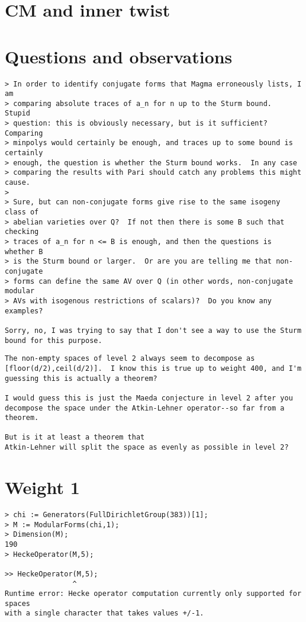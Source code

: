 \documentclass[11pt]{amsart}
\numberwithin{equation}{subsection}
\theoremstyle{definition}
\begin{document}
\section{CM and inner twist}

\section{Questions and observations}

\begin{verbatim}
> In order to identify conjugate forms that Magma erroneously lists, I am
> comparing absolute traces of a_n for n up to the Sturm bound.  Stupid
> question: this is obviously necessary, but is it sufficient?  Comparing
> minpolys would certainly be enough, and traces up to some bound is certainly
> enough, the question is whether the Sturm bound works.  In any case
> comparing the results with Pari should catch any problems this might cause.
>
> Sure, but can non-conjugate forms give rise to the same isogeny class of
> abelian varieties over Q?  If not then there is some B such that checking
> traces of a_n for n <= B is enough, and then the questions is whether B
> is the Sturm bound or larger.  Or are you are telling me that non-conjugate
> forms can define the same AV over Q (in other words, non-conjugate modular
> AVs with isogenous restrictions of scalars)?  Do you know any examples?

Sorry, no, I was trying to say that I don't see a way to use the Sturm
bound for this purpose.
\end{verbatim}

\begin{verbatim}
The non-empty spaces of level 2 always seem to decompose as [floor(d/2),ceil(d/2)].  I know this is true up to weight 400, and I'm guessing this is actually a theorem?

I would guess this is just the Maeda conjecture in level 2 after you
decompose the space under the Atkin-Lehner operator--so far from a
theorem.

But is it at least a theorem that
Atkin-Lehner will split the space as evenly as possible in level 2?
\end{verbatim}

\section{Weight 1}

\begin{verbatim}
> chi := Generators(FullDirichletGroup(383))[1];
> M := ModularForms(chi,1);
> Dimension(M);
190
> HeckeOperator(M,5);

>> HeckeOperator(M,5);
                ^
Runtime error: Hecke operator computation currently only supported for spaces 
with a single character that takes values +/-1.
\end{verbatim}

\begin{thebibliography}{999}

\end{thebibliography}
\end{document}
